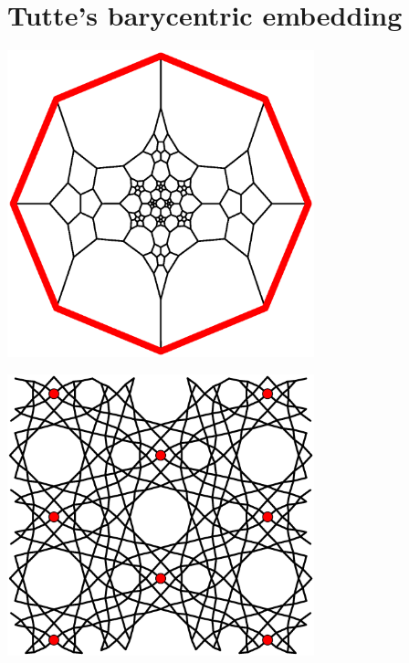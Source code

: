 \documentclass{beamer}
\begin{document}
\section{Tutte's barycentric embedding}

\begin{frame}
  \begin{center}
    \includegraphics[width=3.5in]{schlegel2}
  \end{center}
\end{frame}

\begin{frame}
  \begin{center}
    \includegraphics[width=3.5in]{al-equilibrium}
  \end{center}
\end{frame}
\end{document}
